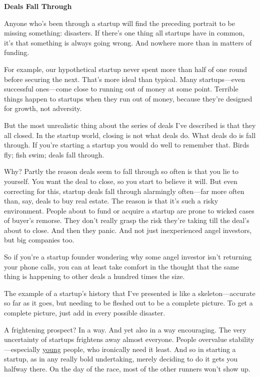 \textbf{Deals Fall Through}

Anyone who's been through a startup will find the preceding portrait to
be missing something: disasters. If there's one thing all startups have
in common, it's that something is always going wrong. And nowhere more
than in matters of funding.

For example, our hypothetical startup never spent more than half of one
round before securing the next. That's more ideal than typical. Many
startups---even successful ones---come close to running out of money at
some point. Terrible things happen to startups when they run out of
money, because they're designed for growth, not adversity.

But the most unrealistic thing about the series of deals I've described
is that they all closed. In the startup world, closing is not what deals
do. What deals do is fall through. If you're starting a startup you
would do well to remember that. Birds fly; fish swim; deals fall
through.

Why? Partly the reason deals seem to fall through so often is that you
lie to yourself. You want the deal to close, so you start to believe it
will. But even correcting for this, startup deals fall through
alarmingly often---far more often than, say, deals to buy real estate.
The reason is that it's such a risky environment. People about to fund
or acquire a startup are prone to wicked cases of buyer's remorse. They
don't really grasp the risk they're taking till the deal's about to
close. And then they panic. And not just inexperienced angel investors,
but big companies too.

So if you're a startup founder wondering why some angel investor isn't
returning your phone calls, you can at least take comfort in the thought
that the same thing is happening to other deals a hundred times the
size.

The example of a startup's history that I've presented is like a
skeleton---accurate so far as it goes, but needing to be fleshed out to
be a complete picture. To get a complete picture, just add in every
possible disaster.

A frightening prospect? In a way. And yet also in a way encouraging. The
very uncertainty of startups frightens away almost everyone. People
overvalue stability---especially \href{hiring.html}{young} people, who
ironically need it least. And so in starting a startup, as in any really
bold undertaking, merely deciding to do it gets you halfway there. On
the day of the race, most of the other runners won't show up.

